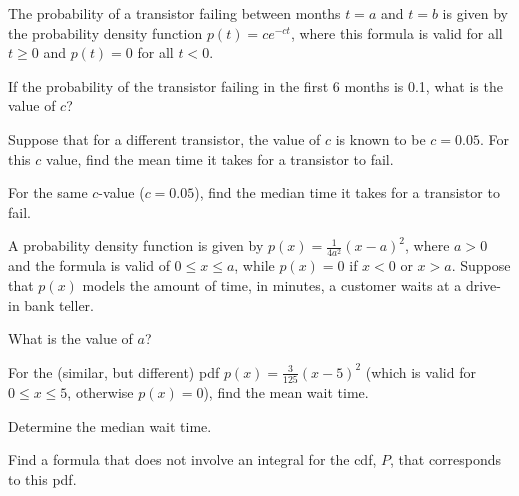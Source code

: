 \begin{exercises} 
  \item The probability of a transistor failing between months $t = a$ and $t = b$ is given by the probability density function $p(t) = ce^{-ct}$, where this formula is valid for all $t \ge 0$ and $p(t) = 0$ for all $t < 0$.
\ba
	\item If the probability of the transistor failing in the first 6 months is 0.1, what is the value of $c$?
	\item Suppose that for a different transistor, the value of $c$ is known to be $c = 0.05$.   For this $c$ value, find the mean time it takes for a transistor to fail.
	\item For the same $c$-value ($c = 0.05$), find the median time it takes for a transistor to fail. 
\ea

\item  A probability density function is given by $p(x) = \frac{1}{4a^2} (x-a)^2$, where $a > 0$ and the formula is valid of $0 \le x \le a$, while $p(x) = 0$ if $x < 0$ or $x > a$.  Suppose that $p(x)$ models the amount of time, in minutes, a customer waits at a drive-in bank teller.
\ba
	\item What is the value of $a$?
	\item For the (similar, but different) pdf $p(x) = \frac{3}{125} (x-5)^2$ (which is valid for $0 \le x \le 5$, otherwise $p(x) = 0$), find the mean wait time.
	\item Determine the median wait time.
	\item Find a formula that does not involve an integral for the cdf, $P$, that corresponds to this pdf.
\ea	
  
\end{exercises}
\afterexercises
